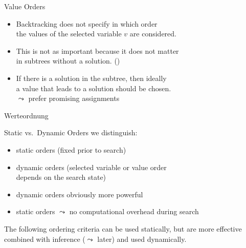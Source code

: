 \begin{frame}{Value Orders}
  \begin{itemize}
  \item Backtracking does not specify in which order \\
    the \alert{values} of the selected variable $v$ are considered.
    \item This is not as important because it \alert{does not matter} \\ in
    subtrees without a solution. ()
    \item \alert{If} there is a solution in the subtree, then
    ideally \\ a value that leads to a solution should be chosen. \\
    $\leadsto$ prefer promising assignments
  \end{itemize}
   Werteordnung
\end{frame}

\begin{frame}{Static vs.\ Dynamic Orders}
  we distinguish:
  \begin{itemize}
  \item \alert{static} orders (fixed prior to search)
  \item \alert{dynamic} orders (selected variable or value
  order \\ depends on the search state)
  \end{itemize}

  \medskip

  \begin{itemize}
  \item dynamic orders obviously more powerful
  \item static orders $\leadsto$ no computational overhead during
  search
  \end{itemize}

  \medskip

  The following ordering criteria can be used statically, but are more
  effective combined with inference ($\leadsto$ later) and used
  dynamically.
\end{frame}

